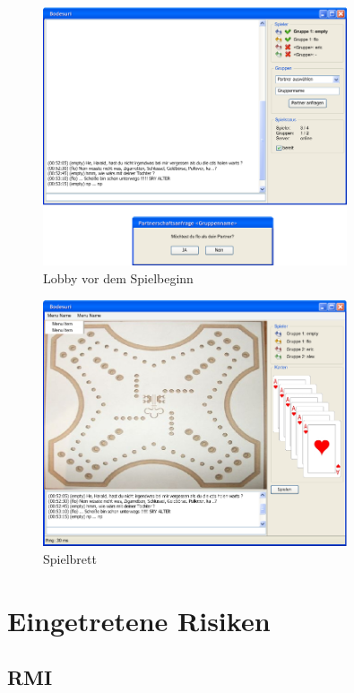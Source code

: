 \documentclass[a4paper,12pt,halfparskip,DIV14]{scrartcl}
\begin{document}
\begin{figure}	[htp] \centering 
	\includegraphics[width=0.8\textwidth]{Externes Design - Lobby.png} \caption{Lobby vor dem Spielbeginn}\label{fig:Externes_Design.jpg} 
\end{figure}
\begin{figure}
	[htp] \centering 
	\includegraphics[width=0.8\textwidth]{Externes Design - Spiel.png} \caption{Spielbrett}\label{fig:Externes_Design.jpg} 
\end{figure}


\newpage
\section{Eingetretene Risiken} %
\label{eingetretene_risiken}

\subsection{RMI} %
\label{sub:rmi}
\end{document}
